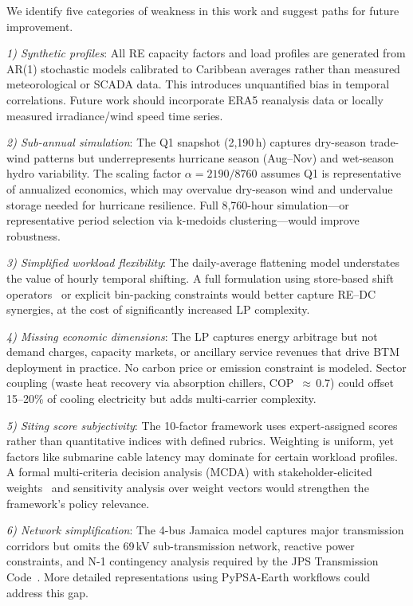\documentclass[conference,10pt]{IEEEtran}
\begin{document}
We identify five categories of weakness in this work and suggest paths for future improvement.

\textit{1) Synthetic profiles}: All RE capacity factors and load profiles are generated from AR(1) stochastic models calibrated to Caribbean averages rather than measured meteorological or SCADA data. This introduces unquantified bias in temporal correlations. Future work should incorporate ERA5 reanalysis data or locally measured irradiance/wind speed time series.

\textit{2) Sub-annual simulation}: The Q1 snapshot (2{,}190\,h) captures dry-season trade-wind patterns but underrepresents hurricane season (Aug--Nov) and wet-season hydro variability. The scaling factor $\alpha = 2190/8760$ assumes Q1 is representative of annualized economics, which may overvalue dry-season wind and undervalue storage needed for hurricane resilience. Full 8{,}760-hour simulation---or representative period selection via k-medoids clustering---would improve robustness.

\textit{3) Simplified workload flexibility}: The daily-average flattening model understates the value of hourly temporal shifting. A full formulation using store-based shift operators~\cite{google247} or explicit bin-packing constraints would better capture RE--DC synergies, at the cost of significantly increased LP complexity.

\textit{4) Missing economic dimensions}: The LP captures energy arbitrage but not demand charges, capacity markets, or ancillary service revenues that drive BTM deployment in practice. No carbon price or emission constraint is modeled. Sector coupling (waste heat recovery via absorption chillers, COP~$\approx$\,0.7) could offset 15--20\% of cooling electricity but adds multi-carrier complexity.

\textit{5) Siting score subjectivity}: The 10-factor framework uses expert-assigned scores rather than quantitative indices with defined rubrics. Weighting is uniform, yet factors like submarine cable latency may dominate for certain workload profiles. A formal multi-criteria decision analysis (MCDA) with stakeholder-elicited weights~\cite{uli2024} and sensitivity analysis over weight vectors would strengthen the framework's policy relevance.

\textit{6) Network simplification}: The 4-bus Jamaica model captures major transmission corridors but omits the 69\,kV sub-transmission network, reactive power constraints, and N-1 contingency analysis required by the JPS Transmission Code~\cite{jps_grid}. More detailed representations using PyPSA-Earth workflows could address this gap.
\end{document}
